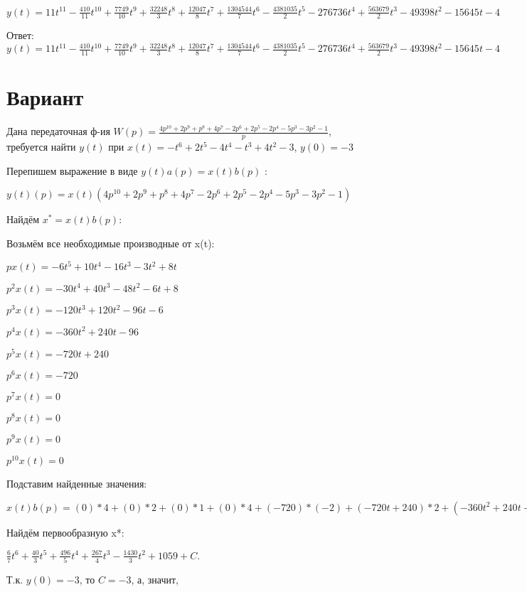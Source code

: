 \documentclass{article}
\begin{document}
{{{{{{$y(t)=11t^{11}-\frac{410}{11}t^{10}+\frac{7749}{10}t^{9}+\frac{32248}{3}t^{8}+\frac{12047}{8}t^{7}+\frac{1304544}{7}t^{6}-\frac{4381035}{2}t^{5}-276736t^{4}+\frac{563679}{2}t^{3}-49398t^{2}-15645t-4$

Ответ: $y(t) = 11t^{11}-\frac{410}{11}t^{10}+\frac{7749}{10}t^{9}+\frac{32248}{3}t^{8}+\frac{12047}{8}t^{7}+\frac{1304544}{7}t^{6}-\frac{4381035}{2}t^{5}-276736t^{4}+\frac{563679}{2}t^{3}-49398t^{2}-15645t-4$

\section{Вариант}

Дана передаточная ф-ия $W(p)=\frac{4p^{10}+2p^{9}+p^{8}+4p^{7}-2p^{6}+2p^{5}-2p^{4}-5p^{3}-3p^{2}-1}{p}$, требуется найти $y(t)$ при $x(t)=-t^{6}+2t^{5}-4t^{4}-t^{3}+4t^{2}-3$, $y(0)=-3$

Перепишем выражение в виде $y(t)a(p)=x(t)b(p)$ :

$y(t)(p)=x(t)(4p^{10}+2p^{9}+p^{8}+4p^{7}-2p^{6}+2p^{5}-2p^{4}-5p^{3}-3p^{2}-1)$

Найдём $x^*=x(t)b(p)$:

Возьмём все необходимые производные от x(t):

$px(t)=-6t^{5}+10t^{4}-16t^{3}-3t^{2}+8t$

$p^2x(t)=-30t^{4}+40t^{3}-48t^{2}-6t+8$

$p^3x(t)=-120t^{3}+120t^{2}-96t-6$

$p^4x(t)=-360t^{2}+240t-96$

$p^5x(t)=-720t+240$

$p^6x(t)=-720$

$p^7x(t)=0$

$p^8x(t)=0$

$p^9x(t)=0$

$p^10x(t)=0$

Подставим найденные значения:

$x(t)b(p) = (0)*4+(0)*2+(0)*1+(0)*4+(-720)*(-2)+(-720t+240)*2+(-360t^{2}+240t-96)*(-2)+(-120t^{3}+120t^{2}-96t-6)*(-5)+(-30t^{4}+40t^{3}-48t^{2}-6t+8)*(-3)+(-6t^{5}+10t^{4}-16t^{3}-3t^{2}+8t)*(-1)=6t^{5}+80t^{4}+496t^{3}+267t^{2}-1430t$





Найдём первообразную x*:

$\frac{6}{7}t^{6}+\frac{40}{3}t^{5}+\frac{496}{5}t^{4}+\frac{267}{4}t^{3}-\frac{1430}{3}t^{2}+1059+C.$

Т.к. $y(0)=-3$, то $C=-3$, а, значит, 

}}}}}}
\end{document}
